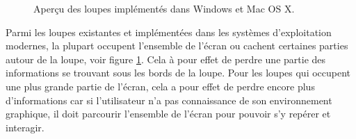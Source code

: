 \begin{figure}
    \centering
    \caption{Aperçu des loupes implémentés dans Windows et Mac OS X.}
	\label{fig:loupeDemo}
\end{figure}

Parmi les loupes existantes et implémentées dans les systèmes d'exploitation modernes, la plupart occupent l'ensemble de l'écran ou cachent certaines parties autour de la loupe, voir figure \ref{fig:loupeDemo}. Cela à pour effet de perdre une partie des informations se trouvant sous les bords de la loupe. Pour les loupes qui occupent une plus grande partie de l'écran, cela a pour effet de perdre encore plus d'informations car si l'utilisateur n'a pas connaissance de son environnement graphique, il doit parcourir l'ensemble de l'écran pour pouvoir s'y repérer et interagir. 


